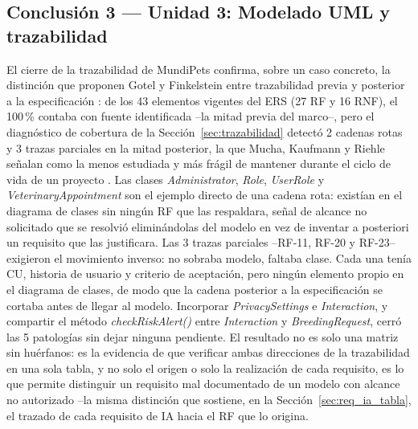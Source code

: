 \documentclass[journal,onecolumn]{IEEEtran}
\begin{document}
	\subsection*{Conclusión 3 --- Unidad 3: Modelado UML y trazabilidad}
	
	El cierre de la trazabilidad de MundiPets confirma, sobre un caso concreto, la	distinción que proponen Gotel y Finkelstein entre trazabilidad previa y	posterior a la especificación \cite{gotel1994}: de los 43 elementos vigentes	del ERS (27 RF y 16 RNF), el 100\,\% contaba con fuente identificada --la mitad	previa del marco--, pero el diagnóstico de cobertura de la	Sección~\ref{sec:trazabilidad} detectó 2 cadenas rotas y 3 trazas parciales en	la mitad posterior, la que Mucha, Kaufmann y Riehle señalan como la menos	estudiada y más frágil de mantener durante el ciclo de vida de un proyecto	\cite{mucha2024}. Las clases \textit{Administrator}, \textit{Role},	\textit{UserRole} y \textit{VeterinaryAppointment} son el ejemplo directo de una	cadena rota: existían en el diagrama de clases sin ningún RF que las respaldara,	señal de alcance no solicitado que se resolvió eliminándolas del modelo en vez	de inventar a posteriori un requisito que las justificara. 	Las 3 trazas parciales --RF-11, RF-20 y RF-23-- exigieron el movimiento	inverso: no sobraba modelo, faltaba clase. Cada una tenía CU, historia de	usuario y criterio de aceptación, pero ningún elemento propio en el diagrama de	clases, de modo que la cadena posterior a la especificación se cortaba antes de	llegar al modelo. Incorporar \textit{PrivacySettings} e \textit{Interaction}, y	compartir el método \textit{checkRiskAlert()} entre \textit{Interaction} y	\textit{BreedingRequest}, cerró las 5 patologías sin dejar ninguna pendiente.	El resultado no es solo una matriz sin huérfanos: es la evidencia de que	verificar ambas direcciones de la trazabilidad en una sola tabla, y no solo el	origen o solo la realización de cada requisito, es lo que permite distinguir un	requisito mal documentado de un modelo con alcance no autorizado --la misma	distinción que sostiene, en la Sección~\ref{sec:req_ia_tabla}, el trazado de	cada requisito de IA hacia el RF que lo origina.
	
	
\end{document}
